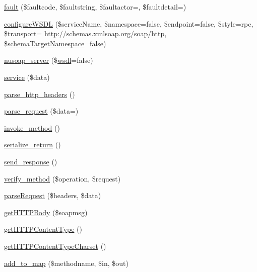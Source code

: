 \begin{DoxyCompactItemize}
\hyperlink{classnusoap__server_ac6a9b7aaeeeecd1e365f8846d4bfc2d9}{fault} (\$faultcode, \$faultstring, \$faultactor=\textquotesingle{}\textquotesingle{}, \$faultdetail=\textquotesingle{}\textquotesingle{})
\item 
\hyperlink{classnusoap__server_a569306e1dcc17e55d737ef6096709e65}{configure\+W\+S\+D\+L} (\$service\+Name, \$namespace=false, \$endpoint=false, \$style=\textquotesingle{}rpc\textquotesingle{}, \$transport= \textquotesingle{}http\+://schemas.\+xmlsoap.\+org/soap/http\textquotesingle{}, \$\hyperlink{_admin_8php_ab197a5bef9bb7041545b3f0b6db00f8f}{schema\+Target\+Namespace}=false)
\item 
\hyperlink{classnusoap__server_a367515afa8e8ec27dc922dc2d66677d0}{nusoap\+\_\+server} (\$\hyperlink{classwsdl}{wsdl}=false)
\item 
\hyperlink{classnusoap__server_ad91e2ca0020e1192392077915db92e41}{service} (\$data)
\item 
\hyperlink{classnusoap__server_aa7d62dcdbc6b24667691c66700bec2ea}{parse\+\_\+http\+\_\+headers} ()
\item 
\hyperlink{classnusoap__server_ac1c98672ed25f0f3b8a7470a342f45c0}{parse\+\_\+request} (\$data=\textquotesingle{}\textquotesingle{})
\item 
\hyperlink{classnusoap__server_afa0f240a77cba882ddb1096255aaa88c}{invoke\+\_\+method} ()
\item 
\hyperlink{classnusoap__server_a2d107db4f89e00b4028dbfb2827c40dd}{serialize\+\_\+return} ()
\item 
\hyperlink{classnusoap__server_a5639906d44165650fa1ee610f2435e89}{send\+\_\+response} ()
\item 
\hyperlink{classnusoap__server_a6621bf070937d91b20824bceedac26f4}{verify\+\_\+method} (\$operation, \$request)
\item 
\hyperlink{classnusoap__server_a7a69990540b6dc277f2775abd40772a1}{parse\+Request} (\$headers, \$data)
\item 
\hyperlink{classnusoap__server_ab1e22b0858bdbe61d2d711ff442c0e78}{get\+H\+T\+T\+P\+Body} (\$soapmsg)
\item 
\hyperlink{classnusoap__server_a2bed19ef2d537dee244535339cd6026a}{get\+H\+T\+T\+P\+Content\+Type} ()
\item 
\hyperlink{classnusoap__server_a9051db33a9b7e50315d9222ef1c52ce9}{get\+H\+T\+T\+P\+Content\+Type\+Charset} ()
\item 
\hyperlink{classnusoap__server_ad2e47223401828fb5e5fe54733abaf9a}{add\+\_\+to\+\_\+map} (\$methodname, \$in, \$out)
\item 

\end{DoxyCompactItemize}
